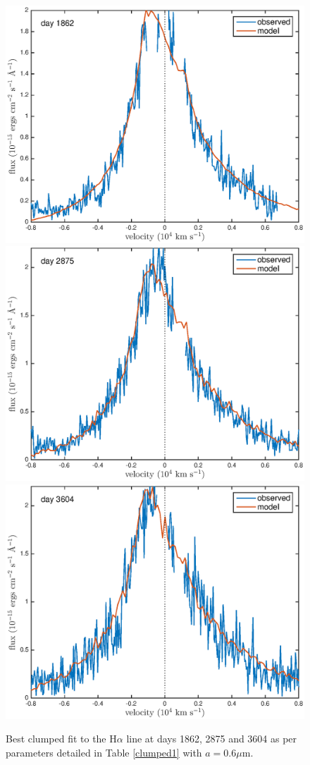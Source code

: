 \documentclass[useAMS,usenatbib,usegraphicx]{mnras}
\begin{document}
\begin{figure}
\begin{center}
\caption{Best clumped fit to the H$\alpha$ line at days 1862, 2875 and 
3604 as per parameters detailed in Table \ref{clumped1} with $a=0.6\mu$m.}
\label{d1862_3604_c}
\includegraphics[trim =37 10 45 15,clip=true,scale=0.35]{clump_1/maximum/d1862Ha}
\includegraphics[trim =55 10 45 15,clip=true,scale=0.35]{clump_1/maximum/d2875Ha}
\includegraphics[trim =55 10 45 15,clip=true,scale=0.35]{clump_1/maximum/d3604Ha}

\end{center}
\end{figure}
\end{document}
